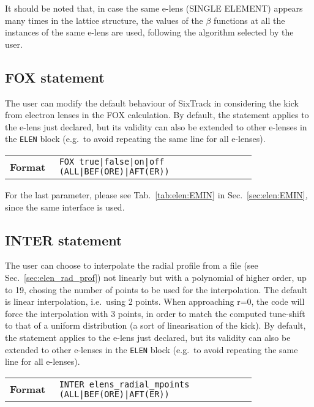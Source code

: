 \bigskip
\noindent It should be noted that, in case the same e-lens (SINGLE ELEMENT) appears many times in the lattice structure, the values of the $\beta$ functions at all the instances of the same e-lens are used, following the algorithm selected by the user.

\subsection{FOX statement}\label{sec:elen:FOX}
The user can modify the default behaviour of SixTrack in considering the kick from electron lenses in the FOX calculation. By default, the statement applies to the e-lens just declared, but its validity can also be extended to other e-lenses in the \texttt{ELEN} block (e.g.~to avoid repeating the same line for all e-lenses).

\bigskip
\begin{tabular}{@{}lp{0.8\linewidth}}
    \textbf{Format}     & \texttt{FOX true|false|on|off (ALL|BEF(ORE)|AFT(ER))} \\
\end{tabular}

\bigskip
\noindent For the last parameter, please see Tab.~\ref{tab:elen:EMIN} in Sec.~\ref{sec:elen:EMIN}, since the same interface is used.

\subsection{INTER statement}\label{sec:elen:INTER}
The user can choose to interpolate the radial profile from a file (see Sec.~\ref{sec:elen_rad_prof}) not linearly but with a polynomial of higher order, up to 19, chosing the number of points to be used for the interpolation. The default is linear interpolation, i.e.~using 2 points. When approaching r=0, the code will force the interpolation with 3 points, in order to match the computed tune-shift to that of a uniform distribution (a sort of linearisation of the kick). By default, the statement applies to the e-lens just declared, but its validity can also be extended to other e-lenses in the \texttt{ELEN} block (e.g.~to avoid repeating the same line for all e-lenses).

\bigskip
\begin{tabular}{@{}lp{0.8\linewidth}}
    \textbf{Format}     & \texttt{INTER elens\_radial\_mpoints (ALL|BEF(ORE)|AFT(ER))} \\
\end{tabular}


